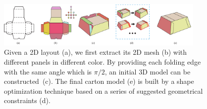 \begin{figure}
	\centering
	\includegraphics[width=0.9\textwidth]{images/overview}
	\caption{Given a 2D layout (a), we first extract its 2D mesh (b) with different panels in different color. By providing each folding edge with the same angle which is $\pi/2$, an initial 3D model can be constructed~(c). The final carton model (e) is built by a shape optimization technique based on a series of suggested geometrical constraints (d).}
	\label{fig:overview}
\end{figure} 
 


